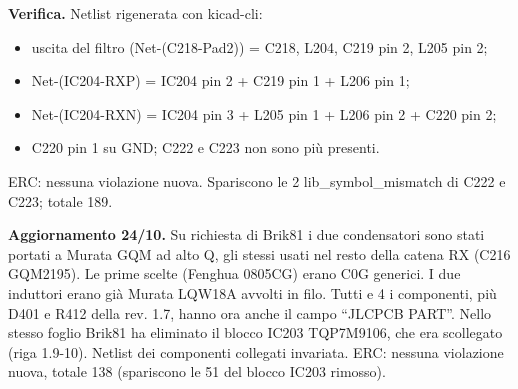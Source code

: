 \textbf{Verifica.} Netlist rigenerata con kicad-cli:

\begin{itemize}
\item uscita del filtro (Net-(C218-Pad2)) = C218, L204, C219 pin 2, L205 pin 2;
\item Net-(IC204-RXP) = IC204 pin 2 + C219 pin 1 + L206 pin 1;
\item Net-(IC204-RXN) = IC204 pin 3 + L205 pin 1 + L206 pin 2 + C220 pin 2;
\item C220 pin 1 su GND; C222 e C223 non sono più presenti.
\end{itemize}

ERC: nessuna violazione nuova. Spariscono le 2 lib\_\allowbreak{}symbol\_\allowbreak{}mismatch di C222 e C223; totale 189.

\textbf{Aggiornamento 24/\allowbreak{}10.} Su richiesta di Brik81 i due condensatori sono stati portati a Murata GQM ad alto Q, gli stessi usati nel resto della catena RX (C216 GQM2195). Le prime scelte (Fenghua 0805CG) erano C0G generici. I due induttori erano già Murata LQW18A avvolti in filo. Tutti e 4 i componenti, più D401 e R412 della rev. 1.7, hanno ora anche il campo \textquotedblleft{}JLCPCB PART\textquotedblright{}. Nello stesso foglio Brik81 ha eliminato il blocco IC203 TQP7M9106, che era scollegato (riga 1.9-10). Netlist dei componenti collegati invariata. ERC: nessuna violazione nuova, totale 138 (spariscono le 51 del blocco IC203 rimosso).
